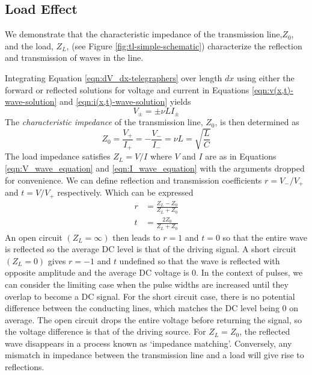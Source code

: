 \documentclass[
	a4paper, %
	10pt, %
	twoside, %
]{journal}
\begin{document}
\subsection{Load Effect}
We demonstrate that the characteristic impedance of the transmission line,$Z_0$, and the load, $Z_L$, (see Figure \ref{fig:tl-simple-schematic}) characterize the reflection and transmission of waves in the line. 

Integrating Equation \ref{eqn:dV_dx-telegraphers} over length $dx$ using either the forward or reflected solutions for voltage and current in Equations \ref{eqn:v(x,t)-wave-solution} and \ref{eqn:i(x,t)-wave-solution} yields
\begin{equation}
    \label{eqn:v=vLi}
    V_{\pm} = \pm \nu L I_{\pm}
\end{equation}
The \emph{characteristic impedance} of the transmission line, $Z_0$, is then determined as
\begin{equation}
    \label{eqn:impedance=sqrt(L/C)}
    Z_0 = \frac{V_+}{I_+} = -\frac{V_-}{I_-} = \nu L = \sqrt{\frac{L}{C}}
\end{equation}
The load impedance satisfies $Z_L = V/I$ where $V$ and $I$ are as in Equations \ref{eqn:V_wave_equation} and \ref{eqn:I_wave_equation} with the arguments dropped for convenience. We can define reflection and transmission coefficients $r = V_-/V_+$ and $t = V/V_+$ respectively. Which can be expressed  
\begin{align}
    \label{eqn:r_reflection_coeff}
    r &= \frac{Z_L - Z_0}{Z_L + Z_0}\\ 
    \label{eqn:t_reflection_coeff}
    t &= \frac{2Z_0}{Z_L + Z_0}
\end{align}
An open circuit $(Z_L = \infty)$ then leads to $r = 1$ and $t = 0$ so that the entire wave is reflected so the average DC level is that of the driving signal. A short circuit $(Z_L = 0)$ gives $r = -1$ and $t$ undefined so that the wave is reflected with opposite amplitude and the average DC voltage is 0. In the context of pulses, we can consider the limiting case when the pulse widths are increased until they overlap to become a DC signal. For the short circuit case, there is no potential difference between the conducting lines, which matches the DC level being 0 on average. The open circuit drops the entire voltage before returning the signal, so the voltage difference is that of the driving source. For $Z_L = Z_0$, the reflected wave disappears in a process known as `impedance matching'. Conversely, any mismatch in impedance between the transmission line and a load will give rise to reflections. 
\end{document}
